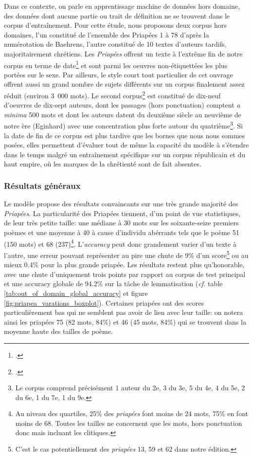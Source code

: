 Dans ce contexte, on parle en apprentissage machine de données hors domaine, des données dont aucune partie ou trait de définition ne se trouvent dans le corpus d'entraînement. Pour cette étude, nous proposons deux corpus hors domaines, l'un constitué de l'ensemble des Priapées 1 à 78 d'après la numérotation de Baehrens, l'autre constitué de 10 textes d'auteurs tardifs, majoritairement chrétiens. Les \textit{Priapées} offrent un texte à l'extrême fin de notre corpus en terme de date\footcite{citroni_les_2008} et sont parmi les oeuvres non-étiquettées les plus portées sur le sexe. Par ailleurs, le style court tout particulier de cet ouvrage offrent aussi un grand nombre de sujets différents sur un corpus finalement assez réduit (environ 3~000 mots). Le second corpus\footcite{glaise_2020_corpus_tardif} est constitué de dix-neuf d'oeuvres de dix-sept auteurs, dont les passages (hors ponctuation) comptent \textit{a minima} 500 mots et dont les auteurs datent du deuxième siècle au neuvième de notre ère (Eginhard) avec une concentration plus forte autour du quatrième\footnote{Le corpus comprend précisément 1 auteur du 2e, 3 du 3e, 5 du 4e, 4 du 5e, 2 du 6e, 1 du 7e, 1 du 9e.}. Si la date de fin de ce corpus est plus tardive que les bornes que nous nous sommes posées, elles permettent d'évaluer tout de même la capacité du modèle à s'étendre dans le temps malgré un entraînement spécifique sur un corpus républicain et du haut empire, où les marques de la chrétienté sont de fait absentes.


\subsubsection{Résultats généraux}

Le modèle propose des résultats convaincants sur une très grande majorité des \textit{Priapées}. La particularité des Priapées tiennent, d'un point de vue statistiques, de leur très petite taille: une médiane à 30 mots sur les soixante-seize premiers poèmes et une moyenne à 40 à cause d'individu abérrants tels que le poème 51 (150 mots) et 68 (237)\footnote{Au niveau des quartiles, 25\% des \textit{priapées} font moins de 24 mots, 75\% en font moins de 68. Toutes les tailles ne concernent que les mots, hors ponctuation donc mais incluant les clitiques.}. L'\textit{accuracy} peut donc grandement varier d'un texte à l'autre, une erreur pouvant représenter au pire une chute de 9\% d'un score\footnote{C'est le cas potentiellement des \textit{priapées} 13, 59 et 62 dans notre édition.} ou au mieux 0.4\% pour la plus grande priapée. Les résultats restent plus qu'honorable, avec une chute d'uniquement trois points par rapport au corpus de test principal et une accuracy globale de 94.2\% sur la tâche de lemmatisation (\textit{cf.} table \ref{tab:out_of_domain_global_accuracy} et figure \ref{fig:priapea_varations_boxplot}). Certaines priapées ont des scores particulièrement bas qui ne semblent pas avoir de lien avec leur taille: on notera ainsi les priapées 75 (82 mots, 84\%) et 46 (45 mots, 84\%) qui se trouvent dans la moyenne haute des tailles de poème.


